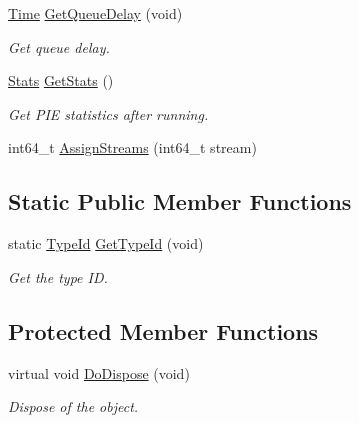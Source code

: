 \begin{DoxyCompactItemize}
\hyperlink{classns3_1_1Time}{Time} \hyperlink{classns3_1_1PieQueueDisc_ad02d1414783963dbea4225da94498862}{Get\+Queue\+Delay} (void)
\begin{DoxyCompactList}\small\item\em Get queue delay. \end{DoxyCompactList}\item 
\hyperlink{structns3_1_1PieQueueDisc_1_1Stats}{Stats} \hyperlink{classns3_1_1PieQueueDisc_aa550014fb4046f11bd90fcbc3f1735f4}{Get\+Stats} ()
\begin{DoxyCompactList}\small\item\em Get P\+IE statistics after running. \end{DoxyCompactList}\item 
int64\+\_\+t \hyperlink{classns3_1_1PieQueueDisc_ab43b15e60cb8d826b9911d5e15c89676}{Assign\+Streams} (int64\+\_\+t stream)
\end{DoxyCompactItemize}
\subsection*{Static Public Member Functions}
\begin{DoxyCompactItemize}
\item 
static \hyperlink{classns3_1_1TypeId}{Type\+Id} \hyperlink{classns3_1_1PieQueueDisc_a77db6d3c88c9d7b3037d1c3bae6fb80f}{Get\+Type\+Id} (void)
\begin{DoxyCompactList}\small\item\em Get the type ID. \end{DoxyCompactList}\end{DoxyCompactItemize}
\subsection*{Protected Member Functions}
\begin{DoxyCompactItemize}
\item 
virtual void \hyperlink{classns3_1_1PieQueueDisc_a8753e73c53483d005228c173cec22de9}{Do\+Dispose} (void)
\begin{DoxyCompactList}\small\item\em Dispose of the object. \end{DoxyCompactList}\end{DoxyCompactItemize}
